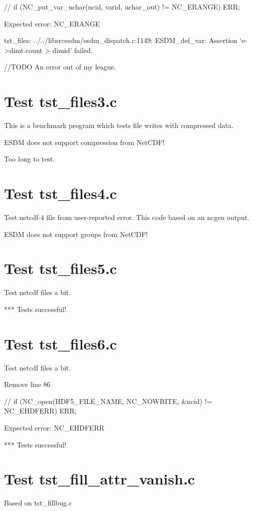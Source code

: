 // if (NC\_put\_var\_uchar(ncid, varid, uchar\_out) != NC\_ERANGE) ERR;

Expected error: NC\_ERANGE

tst\_files: ../../libsrcesdm/esdm\_dispatch.c:1149: ESDM\_def\_var: Assertion `e->dimt.count > dimid' failed.

//TODO An error out of my league.

\section{Test tst\_files3.c}

This is a benchmark program which tests file writes with compressed data.

ESDM does not support compression from NetCDF!

Too long to test.

\section{Test tst\_files4.c}

Test netcdf-4 file from user-reported error. This code based on an ncgen output.

ESDM does not support groups from NetCDF!

\section{Test tst\_files5.c}

Test netcdf files a bit.

*** Tests successful!

\section{Test tst\_files6.c}

Test netcdf files a bit.

Remove line 86

// if (NC\_open(HDF5\_FILE\_NAME, NC\_NOWRITE, \&ncid) != NC\_EHDFERR) ERR;

Expected error: NC\_EHDFERR

*** Tests successful!

\section{Test tst\_fill\_attr\_vanish.c}

Based on tst\_fillbug.c

